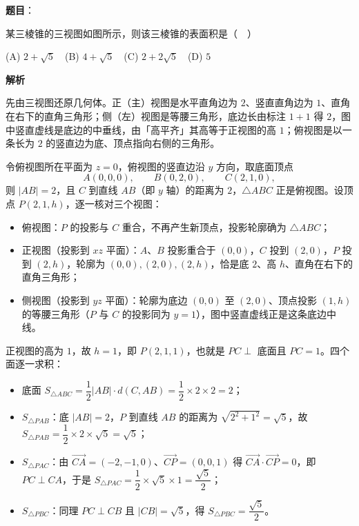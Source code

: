\begin{answer}

\textbf{题目}：

某三棱锥的三视图如图所示，则该三棱锥的表面积是（　）
\nopagebreak[4]
\begin{center}\end{center}
\nopagebreak[4]
(A) \(2+\sqrt{5}\)　(B) \(4+\sqrt{5}\)　(C) \(2+2\sqrt{5}\)　(D) \(5\)

\textbf{解析}

先由三视图还原几何体。正（主）视图是水平直角边为 \(2\)、竖直直角边为 \(1\)、直角在右下的直角三角形；侧（左）视图是等腰三角形，底边长由标注 \(1+1\) 得 \(2\)，图中竖直虚线是底边的中垂线，由「高平齐」其高等于正视图的高 \(1\)；俯视图是以一条长为 \(2\) 的竖直边为底、顶点指向右侧的三角形。

令俯视图所在平面为 \(z=0\)，俯视图的竖直边沿 \(y\) 方向，取底面顶点
\nopagebreak[4]
\[
A(0,0,0),\qquad B(0,2,0),\qquad C(2,1,0),
\]
则 \(|AB|=2\)，且 \(C\) 到直线 \(AB\)（即 \(y\) 轴）的距离为 \(2\)，\(\triangle ABC\) 正是俯视图。设顶点 \(P(2,1,h)\)，逐一核对三个视图：

\begin{itemize}
\item 俯视图：\(P\) 的投影与 \(C\) 重合，不再产生新顶点，投影轮廓确为 \(\triangle ABC\)；
\item 正视图（投影到 \(xz\) 平面）：\(A\)、\(B\) 投影重合于 \((0,0)\)，\(C\) 投到 \((2,0)\)，\(P\) 投到 \((2,h)\)，轮廓为 \((0,0),(2,0),(2,h)\)，恰是底 \(2\)、高 \(h\)、直角在右下的直角三角形；
\item 侧视图（投影到 \(yz\) 平面）：轮廓为底边 \((0,0)\) 至 \((2,0)\)、顶点投影 \((1,h)\) 的等腰三角形（\(P\) 与 \(C\) 的投影同为 \(y=1\)），图中竖直虚线正是这条底边中线。
\end{itemize}

正视图的高为 \(1\)，故 \(h=1\)，即 \(P(2,1,1)\)，也就是 \(PC\perp\) 底面且 \(PC=1\)。四个面逐一求积：

\begin{itemize}
\item 底面 \(S_{\triangle ABC}=\dfrac{1}{2}|AB|\cdot d(C,AB)=\dfrac{1}{2}\times2\times2=2\)；
\item \(S_{\triangle PAB}\)：底 \(|AB|=2\)，\(P\) 到直线 \(AB\) 的距离为 \(\sqrt{2^{2}+1^{2}}=\sqrt{5}\)，故 \(S_{\triangle PAB}=\dfrac{1}{2}\times2\times\sqrt{5}=\sqrt{5}\)；
\item \(S_{\triangle PAC}\)：由 \(\overrightarrow{CA}=(-2,-1,0)\)、\(\overrightarrow{CP}=(0,0,1)\) 得 \(\overrightarrow{CA}\cdot\overrightarrow{CP}=0\)，即 \(PC\perp CA\)，于是 \(S_{\triangle PAC}=\dfrac{1}{2}\times\sqrt{5}\times1=\dfrac{\sqrt{5}}{2}\)；
\item \(S_{\triangle PBC}\)：同理 \(PC\perp CB\) 且 \(|CB|=\sqrt{5}\)，得 \(S_{\triangle PBC}=\dfrac{\sqrt{5}}{2}\)。
\end{itemize}


\end{answer}
